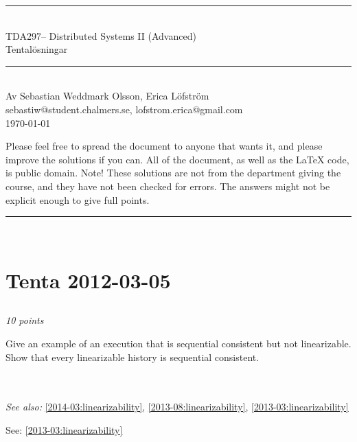\documentclass[a4paper]{article}
\makeatletter
\newcommand{\coursecode}{TDA297}
\newcommand{\coursename}{Distributed Systems II (Advanced)}
\newcommand{\authorname}{Sebastian Weddmark Olsson, Erica Löfström}
\newcommand{\authormail}{sebastiw@student.chalmers.se, lofstrom.erica@gmail.com}
\newcommand{\doctitle}{Tentalösningar}
\newcommand{\horrule}[1]{\rule{\linewidth}{#1}} %
\newcommand{\points}[1]{\subsection{} \textit{#1 points}\\}
\newcommand{\question}[2][]{
  \parbox[t]{\textwidth}{
    \ifthenelse{\equal{#1}{}}{}{#1)}
    \parbox[t]{0.95\textwidth}{#2}}\\}
\newcommand{\seealso}[1]{\\\textit{See also:} #1}
\newcommand{\solution}[2][]{
  \ifthenelse{\equal{#1}{} \or \equal{#1}{a}}{\\[3pt]\textit{Solution: }\\[0.1cm]}{}
  \parbox[t]{\textwidth}{
    \ifthenelse{\equal{#1}{}}{}{#1)}
    \parbox[t]{0.95\textwidth}{#2}}\\
}
\makeatother
\begin{document}
\thispagestyle{plain} %
\begin{center}
\horrule{0.5pt} \\[0.3cm] %
%
\huge \coursecode -- \coursename \\[1mm]
\Large \doctitle \\
\normalsize %
\horrule{2pt} \\[0.1cm] %
Av \authorname \\
\authormail\\[0.1cm]
\footnotesize \today\\[0.4cm]
\end{center}
{\footnotesize
Please feel free to spread the document to anyone that wants it, and please improve the solutions if you can. All of the document, as well as the \LaTeX{} code, is public domain.
Note! These solutions are not from the department giving the course, and they have not been checked for errors. The answers might not be explicit enough to give full points.\\
}
\horrule{0.5pt} %
\normalsize %
\\

\section{Tenta 2012-03-05}

\points{10}
\question{
  Give an example of an execution that is sequential consistent but
  not linearizable. \\
  Show that every linearizable history is sequential consistent.
}
\seealso{\ref{2014-03:linearizability}, \ref{2013-08:linearizability}, \ref{2013-03:linearizability}}
\solution{See: \ref{2013-03:linearizability}}
\end{document}
